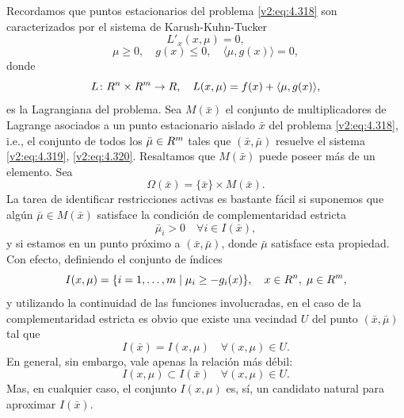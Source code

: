 Recordamos que puntos estacionarios del problema \eqref{v2:eq:4.318} son caracterizados por el sistema de Karush-Kuhn-Tucker
\begin{equation}
    L'_x(x, \mu) = 0,
    \label{v2:eq:4.319}
\end{equation}
\begin{equation}
    \mu \ge 0, \quad g(x) \le 0, \quad \langle \mu, g(x) \rangle = 0,
    \label{v2:eq:4.320}
\end{equation}
donde
\[
    L \colon R^n \times R^m \to R, \quad L(x, \mu) = f(x) + \langle \mu, g(x) \rangle,
\]
es la Lagrangiana del problema.
Sea $M(\bar{x})$ el conjunto de multiplicadores de Lagrange asociados a un punto estacionario aislado $\bar{x}$ del problema \eqref{v2:eq:4.318}, i.e., el conjunto de todos los $\bar{\mu} \in R^m$ tales que $(\bar{x}, \bar{\mu})$ resuelve el sistema \eqref{v2:eq:4.319}, \eqref{v2:eq:4.320}. Resaltamos que $M(\bar{x})$ puede poseer más de un elemento. Sea
\[
    \Omega(\bar{x}) = \{\bar{x}\} \times M(\bar{x}).
\]
La tarea de identificar restricciones activas es bastante fácil si suponemos que algún $\bar{\mu} \in M(\bar{x})$ satisface la condición de complementaridad estricta
\[
    \bar{\mu}_i > 0 \quad \forall i \in I(\bar{x}),
\]
y si estamos en un punto próximo a $(\bar{x}, \bar{\mu})$, donde $\bar{\mu}$ satisface esta propiedad. Con efecto, definiendo el conjunto de índices
\[
    I(x, \mu) = \{i = 1, \dots, m \mid \mu_i \ge -g_i(x)\}, \quad x \in R^n, \; \mu \in R^m,
\]
y utilizando la continuidad de las funciones involucradas, en el caso de la complementaridad estricta es obvio que existe una vecindad $U$ del punto $(\bar{x}, \bar{\mu})$ tal que
\[
    I(\bar{x}) = I(x, \mu) \quad \forall (x, \mu) \in U.
\]
En general, sin embargo, vale apenas la relación más débil:
\[
    I(x, \mu) \subset I(\bar{x}) \quad \forall (x, \mu) \in U.
\]
Mas, en cualquier caso, el conjunto $I(x, \mu)$ es, sí, un candidato natural para aproximar $I(\bar{x})$.

